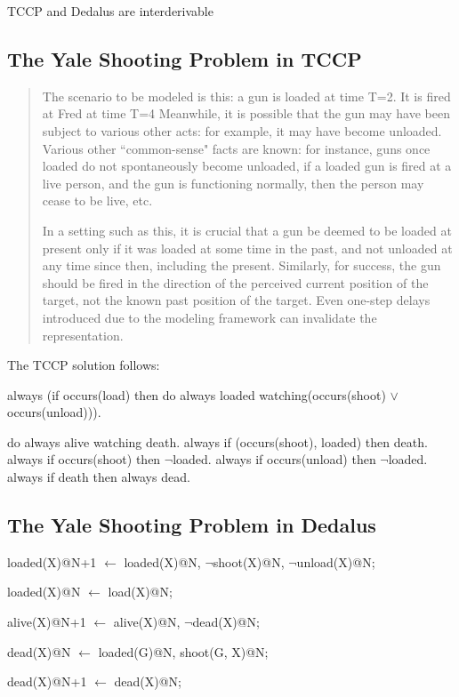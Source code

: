 \begin{conjecture}
TCCP and Dedalus are interderivable
\end{conjecture}

\subsection{The Yale Shooting Problem in TCCP}

\begin{quote}
The scenario to be modeled is this: a gun is loaded at time T=2. It is fired at Fred at time T=4 Meanwhile,
it is possible that the gun may have been subject to various other acts: for example, it 
may have become unloaded. Various other ``common-sense" facts are known: for instance,
guns once loaded do not spontaneously become unloaded, if a loaded gun is fired at a 
live person, and the gun is functioning normally, then the person may cease to be live,
etc.

In a setting such as this, it is crucial that a gun be deemed to be loaded at present only if 
it was loaded at some time in the past, and not unloaded at any time since then, including 
the present. Similarly, for success, the gun should be fired in the direction of the perceived 
current position of the target, not the known past position of the target. Even one-step 
delays introduced due to the modeling framework can invalidate the representation.
\end{quote}

The TCCP solution follows:

\begin{Dedalus}
always (if occurs(load) 
  then do always loaded 
    watching(occurs(shoot) \(\lor\) occurs(unload))).
		
		
do always alive watching death.
always if (occurs(shoot), loaded) then death.
always if occurs(shoot) then \(\lnot\)loaded. 
always if occurs(unload) then  \(\lnot\)loaded.
always if death then always dead.
\end{Dedalus}

\subsection{The Yale Shooting Problem in Dedalus}

\begin{Dedalus}
loaded(X)@N+1 \(\leftarrow\)
  loaded(X)@N,
  \(\lnot\)shoot(X)@N,
  \(\lnot\)unload(X)@N;
  
loaded(X)@N \(\leftarrow\)
   load(X)@N;
   
alive(X)@N+1 \(\leftarrow\)
  alive(X)@N,
  \(\lnot\)dead(X)@N;
  
dead(X)@N \(\leftarrow\)
  loaded(G)@N,
  shoot(G, X)@N;

dead(X)@N+1 \(\leftarrow\)
  dead(X)@N;

\end{Dedalus}




